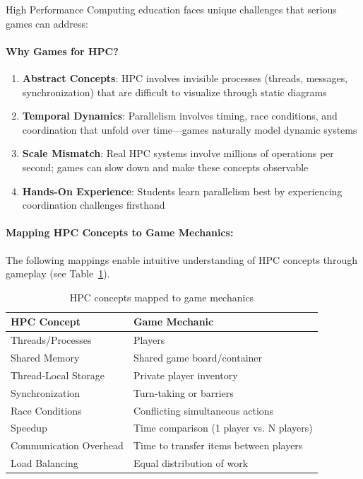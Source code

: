 High Performance Computing education faces unique challenges that serious games can address:

\paragraph*{Why Games for HPC?}

\begin{enumerate}
    \item \textbf{Abstract Concepts}: HPC involves invisible processes (threads, messages, synchronization) that are difficult to visualize through static diagrams
    \item \textbf{Temporal Dynamics}: Parallelism involves timing, race conditions, and coordination that unfold over time---games naturally model dynamic systems
    \item \textbf{Scale Mismatch}: Real HPC systems involve millions of operations per second; games can slow down and make these concepts observable
    \item \textbf{Hands-On Experience}: Students learn parallelism best by experiencing coordination challenges firsthand
\end{enumerate}

\paragraph*{Mapping HPC Concepts to Game Mechanics:}
The following mappings enable intuitive understanding of HPC concepts through gameplay (see Table~\ref{tab:hpc-game-mapping}).

\begin{table}[htbp]
    \centering
    \caption{HPC concepts mapped to game mechanics}
    \label{tab:hpc-game-mapping}
    \begin{tabular}{@{}l|l@{}}
        \toprule
        \textbf{HPC Concept}   & \textbf{Game Mechanic}                   \\
        \midrule
        Threads/Processes      & Players                                  \\
        \midrule
        Shared Memory          & Shared game board/container              \\
        \midrule
        Thread-Local Storage   & Private player inventory                 \\
        \midrule
        Synchronization        & Turn-taking or barriers                  \\
        \midrule
        Race Conditions        & Conflicting simultaneous actions         \\
        \midrule
        Speedup                & Time comparison (1 player vs. N players) \\
        \midrule
        Communication Overhead & Time to transfer items between players   \\
        \midrule
        Load Balancing         & Equal distribution of work               \\
        \bottomrule
    \end{tabular}
\end{table}

